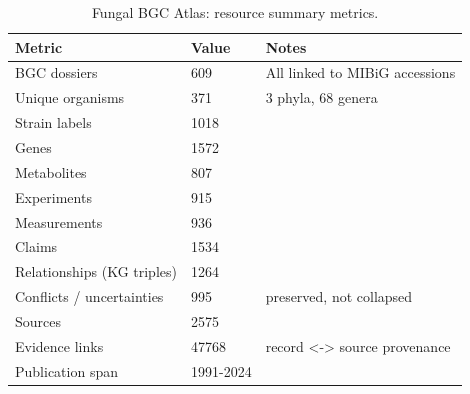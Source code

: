 \begin{table}[htbp]
\centering
\caption{Fungal BGC Atlas: resource summary metrics.}
\label{tab:summary}
\begin{tabular}{l l l}
\toprule
Metric & Value & Notes \\
\midrule
BGC dossiers & 609 & All linked to MIBiG accessions \\
Unique organisms & 371 & 3 phyla, 68 genera \\
Strain labels & 1018 &  \\
Genes & 1572 &  \\
Metabolites & 807 &  \\
Experiments & 915 &  \\
Measurements & 936 &  \\
Claims & 1534 &  \\
Relationships (KG triples) & 1264 &  \\
Conflicts / uncertainties & 995 & preserved, not collapsed \\
Sources & 2575 &  \\
Evidence links & 47768 & record <-> source provenance \\
Publication span & 1991-2024 &  \\
\bottomrule
\end{tabular}
\end{table}